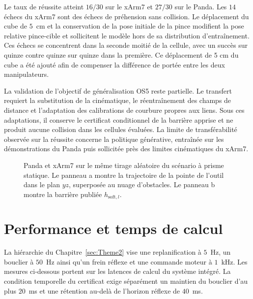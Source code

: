 Le taux de réussite atteint $16/30$ sur le xArm7 et $27/30$ sur le Panda. Les $14$ échecs du xArm7 sont des échecs de préhension sans collision. Le déplacement du cube de $5$~cm et la conservation de la pose initiale de la pince modifient la pose relative pince-cible et sollicitent le modèle hors de sa distribution d'entraînement. Ces échecs se concentrent dans la seconde moitié de la cellule, avec un succès sur quinze contre quinze sur quinze dans la première. Ce déplacement de 5 cm du cube a été ajouté afin de compenser la différence de portée entre les deux manipulateurs.

La validation de l'objectif de généralisation \ac{OS}5 reste partielle. Le transfert requiert la substitution de la cinématique, le réentraînement des champs de distance et l'adaptation des calibrations de courbure propres aux liens. Sous ces adaptations, il conserve le certificat conditionnel de la barrière apprise et ne produit aucune collision dans les cellules évaluées. La limite de transférabilité observée sur la réussite concerne la politique générative, entraînée sur les démonstrations du Panda puis sollicitée près des limites cinématiques du xArm7.

\begin{figure}[!htbp]
    \centering
    
    \caption[Trajectoires et barrières comparées (Panda vs xArm7)]{Panda et xArm7 sur le même tirage aléatoire du scénario à prisme statique. Le panneau a montre la trajectoire de la pointe de l'outil dans le plan $yz$, superposée au nuage d'obstacles. Le panneau b montre la barrière publiée $h_{\mathrm{soft},l}$.}\label{fig:res_xarm}
\end{figure}

\FloatBarrier

\section{Performance et temps de calcul}\label{sec:res_temps}
La hiérarchie du Chapitre~\ref{sec:Theme2} vise une replanification à $5$~Hz, un bouclier à $50$~Hz ainsi qu'un frein réflexe et une commande moteur à $1$~kHz. Les mesures ci-dessous portent sur les latences de calcul du système intégré. La condition temporelle du certificat exige séparément un maintien du bouclier d'au plus $20$~ms et une rétention au-delà de l'horizon réflexe de $40$~ms.

